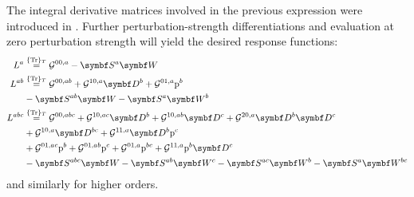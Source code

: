 The integral derivative matrices involved in the previous expression
were introduced in .
Further perturbation-strength differentiations and evaluation at zero
perturbation strength will yield the desired response functions:
\begin{subequations}
  \begin{align}
    L^a &\eqavetr
    \mathcal{G}^{00,a} - \mat{S}^a\mat{W} \label{eq:first-order} \\
    L^{ab} &\eqavetr \mathcal{G}^{00,ab}
    + \mathcal{G}^{10,a}\mat{D}^{b}
    + \mathcal{G}^{01,a}\p^{b} \nonumber \\
    &- \mat{S}^{ab}\mat{W}
    - \mat{S}^{a}\mat{W}^{b} \label{eq:second-order} \\
    L^{abc} &\eqavetr
      \mathcal{G}^{00,abc}
    + \mathcal{G}^{10,ac}\mat{D}^{b}
    + \mathcal{G}^{10,ab}\mat{D}^{c}
    + \mathcal{G}^{20,a}\mat{D}^{b}\mat{D}^{c} \nonumber \\
    &+ \mathcal{G}^{10,a}\mat{D}^{bc}
    + \mathcal{G}^{11,a}\mat{D}^{b}\p^c \label{eq:third-order} \\
    &+ \mathcal{G}^{01,ac}\p^{b}
    + \mathcal{G}^{01,ab}\p^{c}
    + \mathcal{G}^{01,a}\p^{bc}
    + \mathcal{G}^{11,a}\p^{b}\mat{D}^c \nonumber \\
    &- \mat{S}^{abc}\mat{W}
    - \mat{S}^{ab}\mat{W}^{c}
    - \mat{S}^{ac}\mat{W}^{b}
    - \mat{S}^{a}\mat{W}^{bc} \nonumber
  \end{align}
\end{subequations}
and similarly for higher orders.

